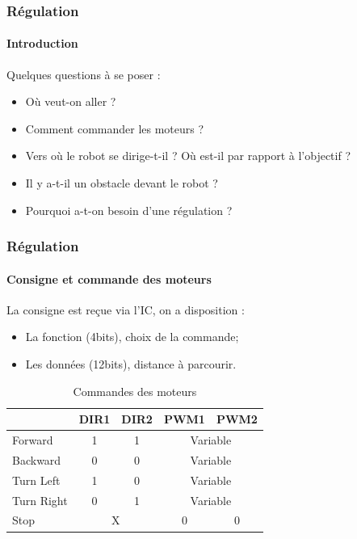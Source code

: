\begin{frame}
\frametitle{Régulation}
\framesubtitle{Introduction}
Quelques questions à se poser :
\begin{itemize}
	\item Où veut-on aller ?
	\item Comment commander les moteurs ?
	\item Vers où le robot se dirige-t-il ? Où est-il par rapport à l'objectif ?
	\item Il y a-t-il un obstacle devant le robot ?
	\item Pourquoi a-t-on besoin d'une régulation ?
\end{itemize}
\end{frame}

\begin{frame}
\frametitle{Régulation}
\framesubtitle{Consigne et commande des moteurs}
La consigne est reçue via l'IC, on a disposition :
\begin{itemize}
	\item La fonction (4bits), choix de la commande;
	\item Les données (12bits), distance à parcourir.
\end{itemize}
\begin{table}[!ht]
	\centering
	\begin{tabular}{|l|cc|cc|}
		\hline
		& DIR1 & DIR2 & PWM1 & PWM2 \\
		\hline
		Forward & 1 & 1 & \multicolumn {2}{c|}{Variable} \\
		\hline
		Backward & 0 & 0 & \multicolumn {2}{c|}{Variable} \\
		\hline
		Turn Left & 1 & 0 & \multicolumn {2}{c|}{Variable} \\
		\hline
		Turn Right & 0 & 1 & \multicolumn {2}{c|}{Variable} \\
		\hline
		Stop & \multicolumn {2}{c|}{X} & 0 & 0 \\
		\hline
	\end{tabular}
	\caption{Commandes des moteurs}
\end{table}
\end{frame}

